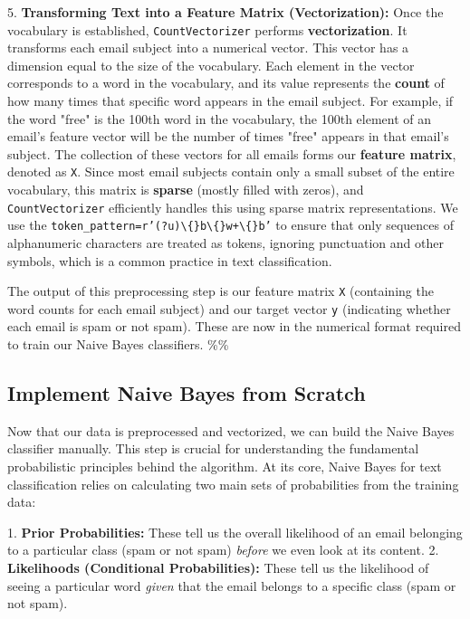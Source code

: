 \documentclass[12pt,a4paper]{article}
\begin{document}
5.  \textbf{Transforming Text into a Feature Matrix (Vectorization):} Once the vocabulary is established, \texttt{CountVectorizer} performs \textbf{vectorization}. It transforms each email subject into a numerical vector. This vector has a dimension equal to the size of the vocabulary. Each element in the vector corresponds to a word in the vocabulary, and its value represents the \textbf{count} of how many times that specific word appears in the email subject. For example, if the word "free" is the 100th word in the vocabulary, the 100th element of an email's feature vector will be the number of times "free" appears in that email's subject. The collection of these vectors for all emails forms our \textbf{feature matrix}, denoted as \texttt{X}. Since most email subjects contain only a small subset of the entire vocabulary, this matrix is \textbf{sparse} (mostly filled with zeros), and \texttt{CountVectorizer} efficiently handles this using sparse matrix representations. We use the \texttt{token\_pattern=r'(?u)\textbackslash\{\}b\textbackslash\{\}w+\textbackslash\{\}b'} to ensure that only sequences of alphanumeric characters are treated as tokens, ignoring punctuation and other symbols, which is a common practice in text classification.

The output of this preprocessing step is our feature matrix \texttt{X} (containing the word counts for each email subject) and our target vector \texttt{y} (indicating whether each email is spam or not spam). These are now in the numerical format required to train our Naive Bayes classifiers.
\%\%


\subsection{Implement Naive Bayes from Scratch}

Now that our data is preprocessed and vectorized, we can build the Naive Bayes classifier manually. This step is crucial for understanding the fundamental probabilistic principles behind the algorithm. At its core, Naive Bayes for text classification relies on calculating two main sets of probabilities from the training data:

1.  \textbf{Prior Probabilities:} These tell us the overall likelihood of an email belonging to a particular class (spam or not spam) \textit{before} we even look at its content.
2.  \textbf{Likelihoods (Conditional Probabilities):} These tell us the likelihood of seeing a particular word \textit{given} that the email belongs to a specific class (spam or not spam).
\end{document}
